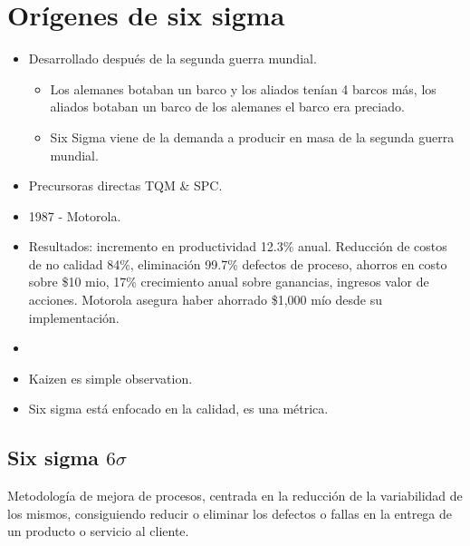 \section{Orígenes de six sigma}
\begin{itemize}
    \item Desarrollado después de la segunda guerra mundial. 
        \begin{itemize}
            \item Los alemanes botaban un barco y los aliados tenían 4 barcos más, los aliados botaban un barco de los alemanes el barco era preciado. 
            \item Six Sigma viene de la demanda a producir en masa de la segunda guerra mundial. 
        \end{itemize}

    \item Precursoras directas TQM \& SPC. 
    \item 1987 - Motorola. 
    \item Resultados: incremento en productividad 12.3\% anual. Reducción de costos de no calidad 84\%, eliminación 99.7\% defectos de proceso, ahorros en costo sobre \$10 mio, 17\% crecimiento anual sobre ganancias, ingresos valor de acciones. Motorola asegura haber ahorrado \$1,000 mío desde su implementación.
    \item {} 
    \item Kaizen es simple observation.
    \item Six sigma está enfocado en la calidad, es una métrica. 
\end{itemize}

\subsection{Six sigma $6\sigma$}
Metodología de mejora de procesos, centrada en la reducción de la variabilidad de los mismos, consiguiendo reducir o eliminar los defectos o fallas en la entrega de un producto o servicio al cliente. 
